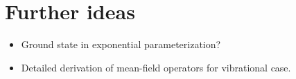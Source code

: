 \documentclass[aip,jcp,preprint,superscriptaddress,nofootinbib]{revtex4-1}
\begin{document}




\section{Further ideas}
\begin{itemize}
    \item Ground state in exponential parameterization?
    \item Detailed derivation of mean-field operators for vibrational case.
\end{itemize}

\newpage

\end{document}
